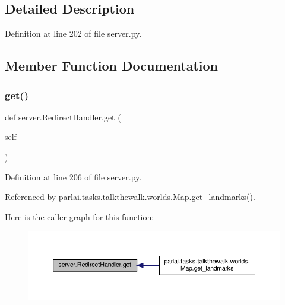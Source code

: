 \subsection{Detailed Description}


Definition at line 202 of file server.\+py.



\subsection{Member Function Documentation}
\mbox{\label{classserver_1_1RedirectHandler_a4a42888a27727c8789b15b4ce00c1856}} 
\subsubsection{\texorpdfstring{get()}{get()}}
{\footnotesize\ttfamily def server.\+Redirect\+Handler.\+get (\begin{DoxyParamCaption}\item[{}]{self }\end{DoxyParamCaption})}



Definition at line 206 of file server.\+py.



Referenced by parlai.\+tasks.\+talkthewalk.\+worlds.\+Map.\+get\+\_\+landmarks().

Here is the caller graph for this function\+:
\nopagebreak
\begin{figure}[H]
\begin{center}
\leavevmode
\includegraphics[width=350pt]{classserver_1_1RedirectHandler_a4a42888a27727c8789b15b4ce00c1856_icgraph}
\end{center}
\end{figure}
\mbox{\label{classserver_1_1RedirectHandler_aa6080e460e55dacb9d05e4b1575d4c8a}} 
